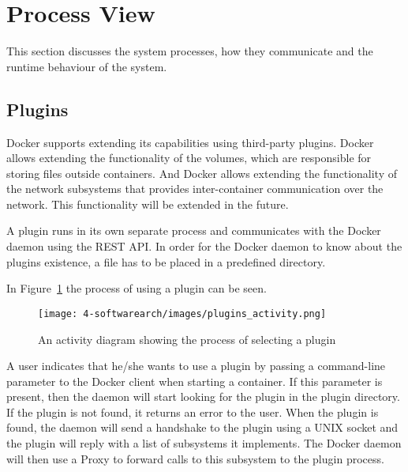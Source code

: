
\section{Process View}
\label{sec:viewprocess}
This section discusses the system processes, how they communicate and the runtime behaviour of the system.


	
\subsection{Plugins}
\label{sec:processplugins}
Docker supports extending its capabilities using third-party plugins. Docker allows extending the functionality of the volumes, which are responsible for storing files outside containers. And Docker allows extending the functionality of the network subsystems that provides inter-container communication over the network. This functionality will be extended in the future\cite{dockerplugindocs}.

A plugin runs in its own separate process and communicates with the Docker daemon using the REST API. In order for the Docker daemon to know about the plugins existence, a file has to be placed in a predefined directory. %

In Figure~\ref{fig:activity_plugin} the process of using a plugin can be seen.
\begin{figure}[H]
\caption{An activity diagram showing the process of selecting a plugin}
\centering
\texttt{[image: 4-softwarearch/images/plugins\_activity.png]}
\label{fig:activity_plugin}
\end{figure}

A user indicates that he/she wants to use a plugin by passing a command-line parameter to the Docker client when starting a container. If this parameter is present, then the daemon will start looking for the plugin in the plugin directory. If the plugin is not found, it returns an error to the user. 
When the plugin is found, the daemon will send a handshake to the plugin using a UNIX socket and the plugin will reply with a list of subsystems it implements. 
The Docker daemon will then use a Proxy to forward calls to this subsystem to the plugin process.
